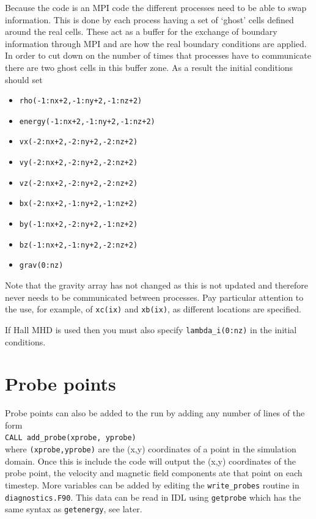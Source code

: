 \documentclass[11pt]{article}
\begin{document}
Because the code is an MPI code the different processes need to be able to swap information. This is done by each 
process having a set of `ghost' cells defined around the real cells. These act as a buffer for the exchange of 
boundary information through MPI and are how the real boundary conditions are applied. In order to cut down on the 
number of times that processes have to communicate there are two ghost cells in this buffer zone. As a result the 
initial conditions should set
\begin{itemize}
\item \texttt{rho(-1:nx+2,-1:ny+2,-1:nz+2)}
\item \texttt{energy(-1:nx+2,-1:ny+2,-1:nz+2)}
\item \texttt{vx(-2:nx+2,-2:ny+2,-2:nz+2)}
\item \texttt{vy(-2:nx+2,-2:ny+2,-2:nz+2)}
\item \texttt{vz(-2:nx+2,-2:ny+2,-2:nz+2)}
\item \texttt{bx(-2:nx+2,-1:ny+2,-1:nz+2)}
\item \texttt{by(-1:nx+2,-2:ny+2,-1:nz+2)}
\item \texttt{bz(-1:nx+2,-1:ny+2,-2:nz+2)}
\item \texttt{grav(0:nz)}
\end{itemize}
Note that the gravity array has not changed as this is not updated and therefore never needs to be communicated between processes.  
Pay particular attention to the use, for example, of \texttt{xc(ix)} and \texttt{xb(ix)}, as different locations are specified.

If Hall MHD is used then you must also specify \texttt{lambda\_i(0:nz)} in the initial conditions.

\section{Probe points}
Probe points can also be added to the run by adding any number of lines of the form\\
\texttt{CALL add\_probe(xprobe, yprobe)}\\
where \texttt{(xprobe,yprobe)} are the (x,y) coordinates of a point in the simulation domain. 
Once this is include the code will output the (x,y) coordinates of the probe point, the velocity 
and magnetic field components ate that point on each timestep. More variables can be added by
editing the \texttt{write\_probes} routine in \texttt{diagnostics.F90}. This data can be read in IDL
using \texttt{getprobe} which has the same syntax as \texttt{getenergy}, see later.
\end{document}
